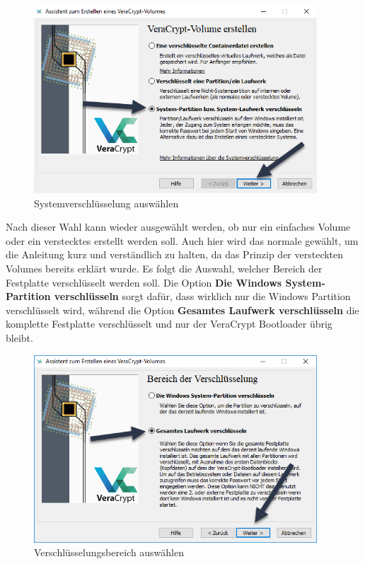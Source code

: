 \documentclass[12pt,a4paper]{scrreprt}
\begin{document}
\begin{figure}[h]
\begin{center}
\includegraphics[width=300pt]{media/systemselection.png}
\caption{Systemverschlüsselung auswählen}
\label{systemselection}
\end{center}
\end{figure}

\noindent Nach dieser Wahl kann wieder ausgewählt werden, ob nur ein einfaches Volume oder ein verstecktes erstellt werden soll. Auch hier wird das normale gewählt, um die Anleitung kurz und verständlich zu halten, da das Prinzip der versteckten Volumes bereits erklärt wurde. Es folgt die Auswahl, welcher Bereich der Festplatte verschlüsselt werden soll. Die Option \textbf{Die Windows System-Partition verschlüsseln} sorgt dafür, dass wirklich nur die Windows Partition verschlüsselt wird, während die Option \textbf{Gesamtes Laufwerk verschlüsseln} die komplette Festplatte verschlüsselt und nur der VeraCrypt Bootloader übrig bleibt.\\

\begin{figure}[h]
\begin{center}
\includegraphics[width=300pt]{media/systempart.png}
\caption{Verschlüsselungsbereich auswählen}
\label{systempart}
\end{center}
\end{figure}
\end{document}
